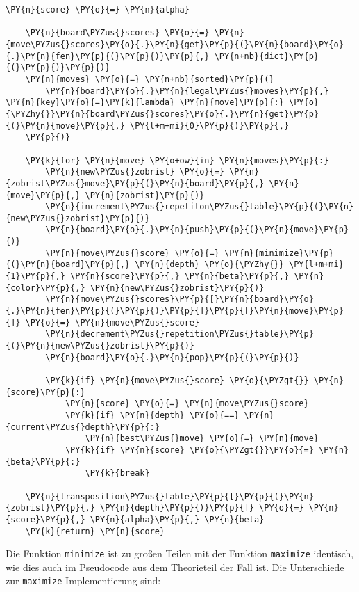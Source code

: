 \begin{tcolorbox}[fontupper=\linespread{.66}\selectfont, breakable, size=fbox, boxrule=1pt, pad at break*=1mm,colback=cellbackground, colframe=cellborder]
\begin{Verbatim}[commandchars=\\\{\}]
    \PY{n}{score} \PY{o}{=} \PY{n}{alpha}

    \PY{n}{board\PYZus{}scores} \PY{o}{=} \PY{n}{move\PYZus{}scores}\PY{o}{.}\PY{n}{get}\PY{p}{(}\PY{n}{board}\PY{o}{.}\PY{n}{fen}\PY{p}{(}\PY{p}{)}\PY{p}{,} \PY{n+nb}{dict}\PY{p}{(}\PY{p}{)}\PY{p}{)}
    \PY{n}{moves} \PY{o}{=} \PY{n+nb}{sorted}\PY{p}{(}
        \PY{n}{board}\PY{o}{.}\PY{n}{legal\PYZus{}moves}\PY{p}{,} \PY{n}{key}\PY{o}{=}\PY{k}{lambda} \PY{n}{move}\PY{p}{:} \PY{o}{\PYZhy{}}\PY{n}{board\PYZus{}scores}\PY{o}{.}\PY{n}{get}\PY{p}{(}\PY{n}{move}\PY{p}{,} \PY{l+m+mi}{0}\PY{p}{)}\PY{p}{,}
    \PY{p}{)}

    \PY{k}{for} \PY{n}{move} \PY{o+ow}{in} \PY{n}{moves}\PY{p}{:}
        \PY{n}{new\PYZus{}zobrist} \PY{o}{=} \PY{n}{zobrist\PYZus{}move}\PY{p}{(}\PY{n}{board}\PY{p}{,} \PY{n}{move}\PY{p}{,} \PY{n}{zobrist}\PY{p}{)}
        \PY{n}{increment\PYZus{}repetiton\PYZus{}table}\PY{p}{(}\PY{n}{new\PYZus{}zobrist}\PY{p}{)}
        \PY{n}{board}\PY{o}{.}\PY{n}{push}\PY{p}{(}\PY{n}{move}\PY{p}{)}
        \PY{n}{move\PYZus{}score} \PY{o}{=} \PY{n}{minimize}\PY{p}{(}\PY{n}{board}\PY{p}{,} \PY{n}{depth} \PY{o}{\PYZhy{}} \PY{l+m+mi}{1}\PY{p}{,} \PY{n}{score}\PY{p}{,} \PY{n}{beta}\PY{p}{,} \PY{n}{color}\PY{p}{,} \PY{n}{new\PYZus{}zobrist}\PY{p}{)}
        \PY{n}{move\PYZus{}scores}\PY{p}{[}\PY{n}{board}\PY{o}{.}\PY{n}{fen}\PY{p}{(}\PY{p}{)}\PY{p}{]}\PY{p}{[}\PY{n}{move}\PY{p}{]} \PY{o}{=} \PY{n}{move\PYZus{}score}
        \PY{n}{decrement\PYZus{}repetition\PYZus{}table}\PY{p}{(}\PY{n}{new\PYZus{}zobrist}\PY{p}{)}
        \PY{n}{board}\PY{o}{.}\PY{n}{pop}\PY{p}{(}\PY{p}{)}

        \PY{k}{if} \PY{n}{move\PYZus{}score} \PY{o}{\PYZgt{}} \PY{n}{score}\PY{p}{:}
            \PY{n}{score} \PY{o}{=} \PY{n}{move\PYZus{}score}
            \PY{k}{if} \PY{n}{depth} \PY{o}{==} \PY{n}{current\PYZus{}depth}\PY{p}{:}
                \PY{n}{best\PYZus{}move} \PY{o}{=} \PY{n}{move}
            \PY{k}{if} \PY{n}{score} \PY{o}{\PYZgt{}}\PY{o}{=} \PY{n}{beta}\PY{p}{:}
                \PY{k}{break}

    \PY{n}{transposition\PYZus{}table}\PY{p}{[}\PY{p}{(}\PY{n}{zobrist}\PY{p}{,} \PY{n}{depth}\PY{p}{)}\PY{p}{]} \PY{o}{=} \PY{n}{score}\PY{p}{,} \PY{n}{alpha}\PY{p}{,} \PY{n}{beta}
    \PY{k}{return} \PY{n}{score}
\end{Verbatim}
\end{tcolorbox}

    Die Funktion \texttt{minimize} ist zu großen Teilen mit der Funktion
\texttt{maximize} identisch, wie dies auch im Pseudocode aus dem
Theorieteil der Fall ist. Die Unterschiede zur
\texttt{maximize}-Implementierung sind:

